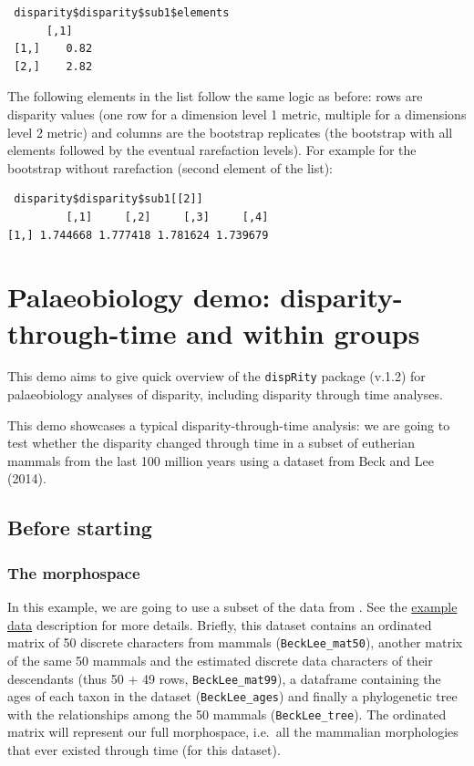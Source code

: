 \documentclass[]{book}
\theoremstyle{definition}
\theoremstyle{definition}
\theoremstyle{definition}
\theoremstyle{remark}
\begin{document}
\begin{verbatim}
 disparity$disparity$sub1$elements
      [,1]
 [1,]    0.82
 [2,]    2.82
\end{verbatim}

The following elements in the list follow the same logic as before: rows
are disparity values (one row for a dimension level 1 metric, multiple
for a dimensions level 2 metric) and columns are the bootstrap
replicates (the bootstrap with all elements followed by the eventual
rarefaction levels). For example for the bootstrap without rarefaction
(second element of the list):

\begin{verbatim}
 disparity$disparity$sub1[[2]]
         [,1]     [,2]     [,3]     [,4]
[1,] 1.744668 1.777418 1.781624 1.739679 
\end{verbatim}

\chapter{Palaeobiology demo: disparity-through-time and within
groups}\label{palaeobiology-demo-disparity-through-time-and-within-groups}

This demo aims to give quick overview of the \texttt{dispRity} package
(v.1.2) for palaeobiology analyses of disparity, including disparity
through time analyses.

This demo showcases a typical disparity-through-time analysis: we are
going to test whether the disparity changed through time in a subset of
eutherian mammals from the last 100 million years using a dataset from
Beck and Lee (2014).

\section{Before starting}\label{before-starting}

\subsection{The morphospace}\label{the-morphospace}

In this example, we are going to use a subset of the data from
\citet{beckancient2014}. See the
\protect\hyperlink{example-data}{example data} description for more
details. Briefly, this dataset contains an ordinated matrix of 50
discrete characters from mammals (\texttt{BeckLee\_mat50}), another
matrix of the same 50 mammals and the estimated discrete data characters
of their descendants (thus 50 + 49 rows, \texttt{BeckLee\_mat99}), a
dataframe containing the ages of each taxon in the dataset
(\texttt{BeckLee\_ages}) and finally a phylogenetic tree with the
relationships among the 50 mammals (\texttt{BeckLee\_tree}). The
ordinated matrix will represent our full morphospace, i.e.~all the
mammalian morphologies that ever existed through time (for this
dataset).
\end{document}
